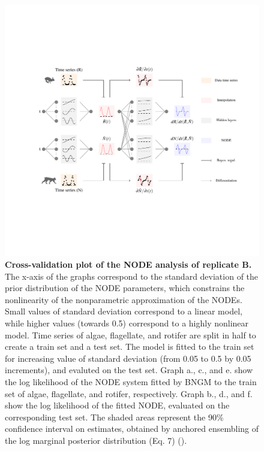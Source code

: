 \documentclass[11pt, oneside]{article}
\begin{document}
\newpage
\begin{figure}[H]
\includegraphics[width=1\linewidth,page=11]{figures/main.pdf}
\caption{
\textbf{Cross-validation plot of the NODE analysis of replicate B.}
The x-axis of the graphs correspond to the standard deviation of the prior distribution of the NODE parameters, which constrains the nonlinearity of the nonparametric approximation of the NODEs.
Small values of standard deviation correspond to a linear model, while higher values (towards 0.5) correspond to a highly nonlinear model.
Time series of algae, flagellate, and rotifer are split in half to create a train set and a test set. 
The model is fitted to the train set for increasing value of standard deviation (from 0.05 to 0.5 by 0.05 increments), and evaluted on the test set.
Graph a., c., and e. show the log likelihood of the NODE system fitted by BNGM to the train set of algae, flagellate, and rotifer, respectively.
Graph b., d., and f. show the log likelihood of the fitted NODE, evaluated on the corresponding test set.
The shaded areas represent the 90\% confidence interval on estimates, obtained by anchored ensembling of the log marginal posterior distribution (Eq. 7) (\cite{Pearce2018}).
}
\end{figure}
\newpage
\end{document}
